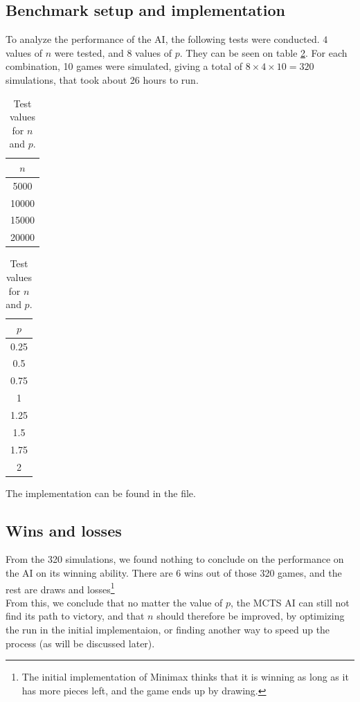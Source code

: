 \subsection{Benchmark setup and implementation}
To analyze the performance of the AI, the following tests were conducted. $4$ values of $n$ were tested, and $8$ values of $p$. They can be seen on table \ref{table:benchmark_values}. For each combination, 10 games were simulated, giving a total of $8\times4\times10 = 320$ simulations, that took about 26 hours to run.
\begin{table}[h]
    \centering
    \begin{tabular}{|c|}
        \hline 
        $n$ \\
        \hline
        5000 \\
        10000 \\
        15000 \\
        20000 \\
        \hline
    \end{tabular}
    \begin{tabular}{|c|}
        \hline 
        $p$ \\
        \hline
        0.25 \\
        0.5 \\
        0.75 \\
        1 \\
        1.25 \\
        1.5 \\
        1.75 \\
        2 \\
        \hline
    \end{tabular}
    \caption{Test values for $n$ and $p$.}
    \label{table:benchmark_values}
\end{table}

The implementation can be found in the  file.
\subsection{Wins and losses}
From the 320 simulations, we found nothing to conclude on the performance on the AI on its winning ability. There are 6 wins out of those 320 games, and the rest are draws and losses\footnote{The initial implementation of Minimax thinks that it is winning as long as it has more pieces left, and the game ends up by drawing.} \\

From this, we conclude that no matter the value of $p$, the MCTS AI can still not find its path to victory, and that $n$ should therefore be improved, by optimizing the run in the initial implementaion, or finding another way to speed up the process (as will be discussed later).

